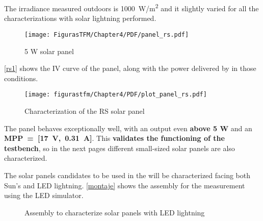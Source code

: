 The irradiance measured outdoors is \SI{1000}{W/m^2} and it slightly varied for all the characterizations with solar lightning performed.


		\begin{figure} [H]
			\centering
			\texttt{[image: FigurasTFM/Chapter4/PDF/panel\_rs.pdf]}
			\caption{5 W solar panel \cite{panelrs}} 	\label{rs}
			\vspace{-0.5cm}
\end{figure}

\autoref{rs1} shows the IV curve of the panel, along with the power delivered by in those conditions.


\begin{figure}[H]
			\centering
			\texttt{[image: figurastfm/Chapter4/PDF/plot\_panel\_rs.pdf]}
			\caption{Characterization of the RS solar panel} \label{rs1}
			\vspace{-0.5cm}
\end{figure}

The panel behaves exceptionally well, with an output even \textbf{above 5 W} and an \textbf{MPP~=~[17~V,~0.31~A]}. This \textbf{validates the functioning of the testbench}, so in the next pages different small-sized solar panels are also characterized.

The solar panels candidates to be used in the  will be characterized facing both Sun's and \acrshort{LED} lightning. \autoref{montaje} shows the assembly for the measurement using the \acrshort{LED} simulator.

\begin{figure}[H]
			\centering
			\quad
			\caption{Assembly to characterize solar panels with \acrshort{LED} lightning} \label{montaje}
\end{figure}

